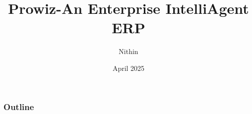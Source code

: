 \documentclass{beamer}
\title[Prowiz]{Prowiz-An Enterprise IntelliAgent ERP}
\author[Nithin]{Nithin}
\institute[Nithin]{A collaborative effort of \textbf{Dhvani-AI}, \textbf{Cortez}, \textbf{Kavin}}
\date{April 2025}
\begin{document}
\begin{frame}
  \titlepage
\end{frame}

\begin{frame}
  \frametitle{Outline}
  \tableofcontents
\end{frame}

%     




\end{document}
